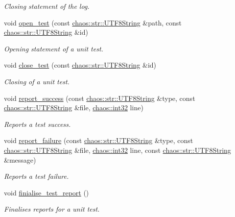 \begin{DoxyCompactItemize}
\begin{DoxyCompactList}\small\item\em Closing statement of the log. \end{DoxyCompactList}\item 
void \hyperlink{classchaos_1_1test_1_1_test_logger_ac6744b59f304552bb819dd8f4d724143}{open\-\_\-test} (const \hyperlink{classchaos_1_1str_1_1_u_t_f8_string}{chaos\-::str\-::\-U\-T\-F8\-String} \&path, const \hyperlink{classchaos_1_1str_1_1_u_t_f8_string}{chaos\-::str\-::\-U\-T\-F8\-String} \&id)
\begin{DoxyCompactList}\small\item\em Opening statement of a unit test. \end{DoxyCompactList}\item 
void \hyperlink{classchaos_1_1test_1_1_test_logger_a5b1f6f1abbedaea7f5475e0dc2677c3c}{close\-\_\-test} (const \hyperlink{classchaos_1_1str_1_1_u_t_f8_string}{chaos\-::str\-::\-U\-T\-F8\-String} \&id)
\begin{DoxyCompactList}\small\item\em Closing of a unit test. \end{DoxyCompactList}\item 
void \hyperlink{classchaos_1_1test_1_1_test_logger_ae26a666c0a9aade6390edf9ec916c9d3}{report\-\_\-success} (const \hyperlink{classchaos_1_1str_1_1_u_t_f8_string}{chaos\-::str\-::\-U\-T\-F8\-String} \&type, const \hyperlink{classchaos_1_1str_1_1_u_t_f8_string}{chaos\-::str\-::\-U\-T\-F8\-String} \&file, \hyperlink{namespacechaos_ad1de7efb430365afd2c9446a0f522a90}{chaos\-::int32} line)
\begin{DoxyCompactList}\small\item\em Reports a test success. \end{DoxyCompactList}\item 
void \hyperlink{classchaos_1_1test_1_1_test_logger_a7bde1d40286619bbef932dfa72f9c419}{report\-\_\-failure} (const \hyperlink{classchaos_1_1str_1_1_u_t_f8_string}{chaos\-::str\-::\-U\-T\-F8\-String} \&type, const \hyperlink{classchaos_1_1str_1_1_u_t_f8_string}{chaos\-::str\-::\-U\-T\-F8\-String} \&file, \hyperlink{namespacechaos_ad1de7efb430365afd2c9446a0f522a90}{chaos\-::int32} line, const \hyperlink{classchaos_1_1str_1_1_u_t_f8_string}{chaos\-::str\-::\-U\-T\-F8\-String} \&message)
\begin{DoxyCompactList}\small\item\em Reports a test failure. \end{DoxyCompactList}\item 
\hypertarget{classchaos_1_1test_1_1_test_logger_a1969e1ba65fc7971b810eeb42bbc6be3}{void \hyperlink{classchaos_1_1test_1_1_test_logger_a1969e1ba65fc7971b810eeb42bbc6be3}{finialise\-\_\-test\-\_\-report} ()}\label{classchaos_1_1test_1_1_test_logger_a1969e1ba65fc7971b810eeb42bbc6be3}

\begin{DoxyCompactList}\small\item\em Finalises reports for a unit test. \end{DoxyCompactList}\end{DoxyCompactItemize}


